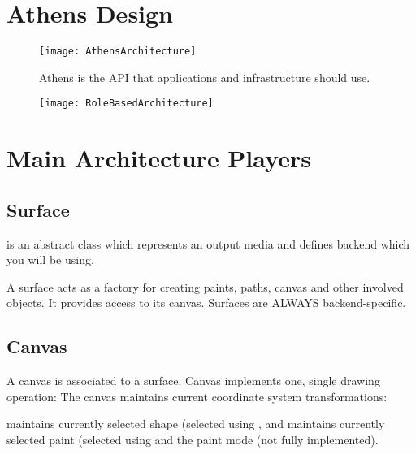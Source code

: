 \documentclass[a4paper,10pt,twoside]{book}
\begin{document}
\section{Athens Design}


\begin{figure}[!h]
\begin{center}
\texttt{[image: AthensArchitecture]}
\caption{ Athens is the API that applications and infrastructure should use. \label{fig:AthensArchitecture}}
\end{center}
\end{figure}

\begin{figure}[!h]
\begin{center}
\texttt{[image: RoleBasedArchitecture]}
\caption{ \label{fig:RoleBasedArchitecture}}
\end{center}
\end{figure}

\section{Main Architecture Players}

\subsection{Surface}
 is an abstract class which represents an output media and defines backend which you will be using.

A surface acts as a factory for creating paints, paths, canvas and other involved objects. 
It provides access to its canvas. Surfaces are ALWAYS backend-specific. 


\subsection{Canvas}
A canvas is associated to a surface. Canvas implements one, single drawing operation:   
The canvas maintains current coordinate system transformations:

 maintains currently selected shape (selected using , and 
maintains currently selected paint (selected using  and the paint mode (not fully implemented). 



\ifx\wholebook\relax\else
   
   
\end{document}
